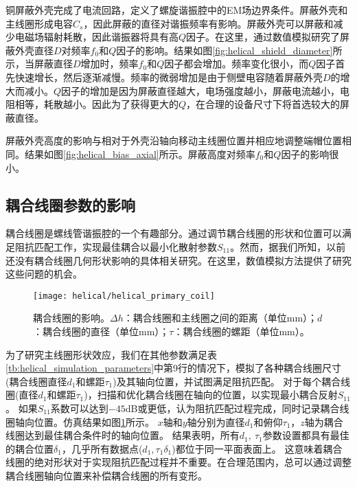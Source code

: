 铜屏蔽外壳完成了电流回路，定义了螺旋谐振腔中的EM场边界条件。屏蔽外壳和主线圈形成电容$C_s$，因此屏蔽的直径对谐振频率有影响。屏蔽外壳可以屏蔽和减少电磁场辐射耗散，因此谐振器将具有高$Q$因子。在这里，通过数值模拟研究了屏蔽外壳直径$ D $对频率$f_0$和$ Q $因子的影响。结果如图\ref{fig:helical_shield_diameter}所示，当屏蔽直径$ D $增加时，频率$f_0$和$ Q $因子都会增加。频率变化很小，而$ Q $因子首先快速增长，然后逐渐减慢。频率的微弱增加是由于侧壁电容随着屏蔽外壳$D$的增大而减小。$Q$因子的增加是因为屏蔽直径越大，电场强度越小，屏蔽电流越小，电阻相等，耗散越小。因此为了获得更大的$Q$，在合理的设备尺寸下将首选较大的屏蔽直径。

屏蔽外壳高度的影响与相对于外壳沿轴向移动主线圈位置并相应地调整端帽位置相同。结果如图\ref{fig:helical_bias_axial}所示。屏蔽高度对频率$f_0$和$Q$因子的影响很小。

\subsection[耦合线圈参数的影响]{耦合线圈参数的影响}

耦合线圈是螺线管谐振腔的一个有趣部分。通过调节耦合线圈的形状和位置可以满足阻抗匹配工作，实现最佳耦合以最小化散射参数$S_{11}$。然而，据我们所知，以前还没有耦合线圈几何形状影响的具体相关研究。在这里，数值模拟方法提供了研究这些问题的机会。

\begin{figure}
    \centering
    \caption[耦合线圈的影响]{耦合线圈的影响。$\Delta h$：耦合线圈和主线圈之间的距离（单位mm）；$d$：耦合线圈的直径（单位mm）；$\tau$：耦合线圈的螺距（单位mm）。\label{fig:helical_primary_coil}}
    \texttt{[image: helical/helical\_primary\_coil]}
\end{figure}

为了研究主线圈形状效应，我们在其他参数满足表\ref{tb:helical_simulation_parameters}中第9行的情况下，模拟了各种耦合线圈尺寸(耦合线圈直径$d_1$和螺距$\tau_1$)及其轴向位置，并试图满足阻抗匹配。
对于每个耦合线圈(直径$d_1$和螺距$\tau_1$)，扫描和优化耦合线圈在轴向的位置，以实现最小耦合反射$S_{11}$。
如果$S_{11}$系数可以达到$-45$dB或更低，认为阻抗匹配过程完成，同时记录耦合线圈轴向位置。仿真结果如图\ref{fig:helical_primary_coil}所示。
$x$轴和$y$轴分别为直径$d_1$和俯仰$\tau_1$，$z$轴为耦合线圈达到最佳耦合条件时的轴向位置。
结果表明，所有$ d_1,\ \tau_1 $参数设置都具有最佳的耦合位置$ \delta_1$，几乎所有数据点($d_1,\tau_1\delta_1$)都位于同一平面表面上。
这意味着耦合线圈的绝对形状对于实现阻抗匹配过程并不重要。在合理范围内，总可以通过调整耦合线圈轴向位置来补偿耦合线圈的所有变形。

